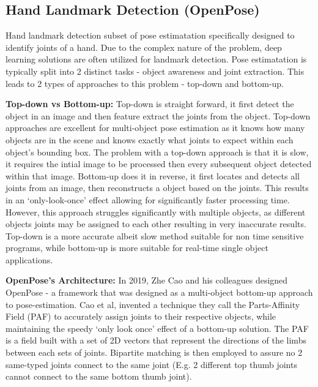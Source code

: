 \documentclass[11pt]{article}
\def\paraskip{\vskip 0.4cm}
\begin{document}
    \subsection{Hand Landmark Detection (OpenPose)}
        Hand landmark detection subset of pose estimatation specifically designed to identify joints of a hand. Due to the complex nature of the problem, deep learning solutions are often utilized for landmark detection. Pose estimatation is typically split into 2 distinct tasks - object awareness and joint extraction. This leads to 2 types of approaches to this problem - top-down and bottom-up. 
        
        \paraskip

        \noindent\textbf{Top-down vs Bottom-up: } Top-down is straight forward, it first detect the object in an image and then feature extract the joints from the object. Top-down approaches are excellent for multi-object pose estimation as it knows how many objects are in the scene and knows exactly what joints to expect within each object's bounding box. The problem with a top-down approach is that it is slow, it requires the intial image to be processed then every subsequent object detected within that image. Bottom-up does it in reverse, it first locates and detects all joints from an image, then reconstructs a object based on the joints. This results in an `only-look-once' effect allowing for significantly faster processing time. However, this approach struggles significantly with multiple objects, as different objects joints may be assigned to each other resulting in very inaccurate results. Top-down is a more accurate albeit slow method suitable for non time sensitive programs, while bottom-up is more suitable for real-time single object applications. 

        \paraskip
        \noindent\textbf{OpenPose's Architecture: } In 2019, Zhe Cao and his colleagues designed OpenPose - a framework that was designed as a multi-object bottom-up approach to pose-estimation. Cao et al, invented a technique they call the Parts-Affinity Field (PAF) to accurately assign joints to their respective objects, while maintaining the speedy `only look once' effect of a bottom-up solution. The PAF is a field built with a set of 2D vectors that represent the directions of the limbs between each sets of joints. Bipartite matching is then employed to assure no 2 same-typed joints connect to the same joint (E.g. 2 different top thumb joints cannot connect to the same bottom thumb joint).
\end{document}
